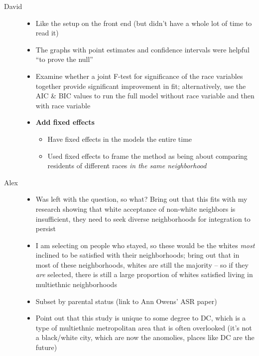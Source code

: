\documentclass{baderart}
\providecommand{\tightlist}{%
  \setlength{\itemsep}{0pt}\setlength{\parskip}{0pt}}
\begin{document}
\begin{description}
\item[David]
\begin{itemize}
\tightlist
\item
  Like the setup on the front end (but didn't have a whole lot of time
  to read it)
\item
  The graphs with point estimates and confidence intervals were helpful
  ``to prove the null''
\item
  Examine whether a joint F-test for significance of the race variables
  together provide significant improvement in fit; alternatively, use
  the AIC \& BIC values to run the full model without race variable and
  then with race variable
\item
  \textbf{Add fixed effects}

  \begin{itemize}
  \tightlist
  \item
    Have fixed effects in the models the entire time
  \item
    Used fixed effects to frame the method as being about comparing
    residents of different races \emph{in the same neighborhood}
  \end{itemize}
\end{itemize}
\item[Alex]
\begin{itemize}
\tightlist
\item
  Was left with the question, so what? Bring out that this fits with my
  research showing that white acceptance of non-white neighbors is
  insufficient, they need to seek diverse neighborhoods for integration
  to persist
\item
  I am selecting on people who stayed, so these would be the whites
  \emph{most} inclined to be satisfied with their neighborhoods; bring
  out that in most of these neighborhoods, whites are still the majority
  -- so if they \emph{are} selected, there is still a large proportion
  of whites satisfied living in multiethnic neighborhoods
\item
  Subset by parental status (link to Ann Owens' ASR paper)
\item
  Point out that this study is unique to some degree to DC, which is a
  type of multiethnic metropolitan area that is often overlooked (it's
  not a black/white city, which are now the anomolies, places like DC
  are the future)
\end{itemize}
\end{description}
\end{document}
